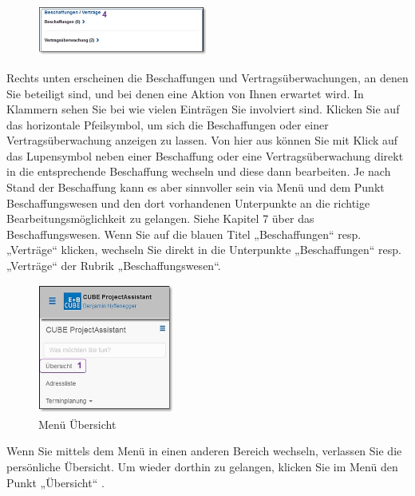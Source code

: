 \begin{figure}
  \vspace{-20pt}
  \begin{center}
    \includegraphics[width=0.5\textwidth]{../chapters/01_Einfuehrung/pictures/1-3-2_persUebersichtBeschaffung.jpg}
  \end{center}
  \vspace{-20pt}
  \vspace{-10pt}
\end{figure}
Rechts unten erscheinen die Beschaffungen  und Vertragsüberwachungen, an denen Sie beteiligt sind, und bei denen eine Aktion von Ihnen erwartet wird. In Klammern sehen Sie bei wie vielen Einträgen Sie involviert sind. Klicken Sie auf das horizontale Pfeilsymbol, um sich die Beschaffungen oder einer Vertragsüberwachung anzeigen zu lassen. Von hier aus können Sie mit Klick auf das Lupensymbol neben einer Beschaffung oder eine Vertragsüberwachung direkt in die entsprechende Beschaffung wechseln und diese dann bearbeiten. Je nach Stand der Beschaffung kann es aber sinnvoller sein via Menü und dem Punkt Beschaffungswesen und den dort vorhandenen Unterpunkte an die richtige Bearbeitungsmöglichkeit zu gelangen. Siehe Kapitel 7 über das Beschaffungswesen. Wenn Sie auf die blauen Titel „Beschaffungen“ resp. „Verträge“  klicken, wechseln Sie direkt in die Unterpunkte „Beschaffungen“ resp. „Verträge“ der Rubrik „Beschaffungswesen“.

\vspace{\baselineskip}

\begin{figure}
  \vspace{-30pt}
  \begin{center}
    \includegraphics[width=0.4\textwidth]{../chapters/01_Einfuehrung/pictures/1-3-2_MenuepunktUebersicht.jpg}
  \end{center}
  \vspace{-20pt}
  \caption{Menü Übersicht}
  \vspace{-10pt}
\end{figure}
Wenn Sie mittels dem Menü in einen anderen Bereich wechseln, verlassen Sie die persönliche Übersicht. Um wieder dorthin zu gelangen, klicken Sie im Menü den Punkt „Übersicht“ .

